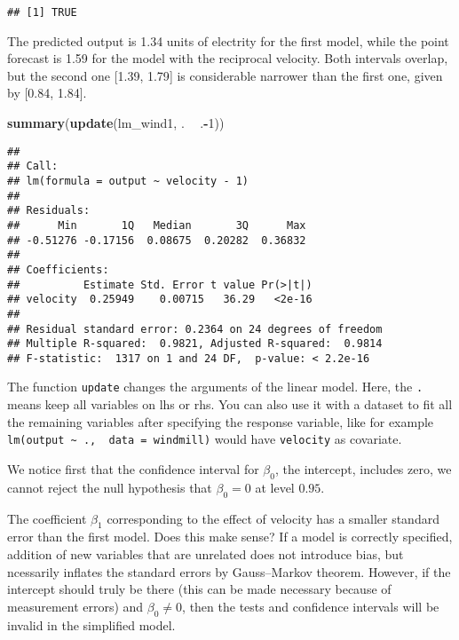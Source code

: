 \documentclass[]{book}
\newenvironment{Shaded}{\begin{snugshade}}{\end{snugshade}}
\newcommand{\DecValTok}[1]{\textcolor[rgb]{0.00,0.00,0.81}{#1}}
\newcommand{\KeywordTok}[1]{\textcolor[rgb]{0.13,0.29,0.53}{\textbf{#1}}}
\newcommand{\NormalTok}[1]{#1}
\newcommand{\OperatorTok}[1]{\textcolor[rgb]{0.81,0.36,0.00}{\textbf{#1}}}
\newcommand{\StringTok}[1]{\textcolor[rgb]{0.31,0.60,0.02}{#1}}
\theoremstyle{definition}
\theoremstyle{definition}
\theoremstyle{definition}
\theoremstyle{remark}
\begin{document}
\begin{verbatim}
## [1] TRUE
\end{verbatim}

The predicted output is 1.34 units of electrity for the first model,
while the point forecast is 1.59 for the model with the reciprocal
velocity. Both intervals overlap, but the second one {[}1.39, 1.79{]} is
considerable narrower than the first one, given by {[}0.84, 1.84{]}.

\begin{Shaded}
\begin{Highlighting}[]
\KeywordTok{summary}\NormalTok{(}\KeywordTok{update}\NormalTok{(lm_wind1, . }\OperatorTok{~}\StringTok{ }\NormalTok{.}\OperatorTok{-}\DecValTok{1}\NormalTok{))}
\end{Highlighting}
\end{Shaded}

\begin{verbatim}
## 
## Call:
## lm(formula = output ~ velocity - 1)
## 
## Residuals:
##      Min       1Q   Median       3Q      Max 
## -0.51276 -0.17156  0.08675  0.20282  0.36832 
## 
## Coefficients:
##          Estimate Std. Error t value Pr(>|t|)
## velocity  0.25949    0.00715   36.29   <2e-16
## 
## Residual standard error: 0.2364 on 24 degrees of freedom
## Multiple R-squared:  0.9821, Adjusted R-squared:  0.9814 
## F-statistic:  1317 on 1 and 24 DF,  p-value: < 2.2e-16
\end{verbatim}

The function \texttt{update} changes the arguments of the linear model.
Here, the \texttt{.} means keep all variables on lhs or rhs. You can
also use it with a dataset to fit all the remaining variables after
specifying the response variable, like for example
\texttt{lm(output\ \textasciitilde{}\ .,\ \ data\ =\ windmill)} would
have \texttt{velocity} as covariate.

We notice first that the confidence interval for \(\beta_0\), the
intercept, includes zero, we cannot reject the null hypothesis that
\(\beta_0=0\) at level \(0.95\).

The coefficient \(\beta_1\) corresponding to the effect of velocity has
a smaller standard error than the first model. Does this make sense? If
a model is correctly specified, addition of new variables that are
unrelated does not introduce bias, but ncessarily inflates the standard
errors by Gauss--Markov theorem. However, if the intercept should truly
be there (this can be made necessary because of measurement errors) and
\(\beta_0 \neq 0\), then the tests and confidence intervals will be
invalid in the simplified model.
\end{document}

